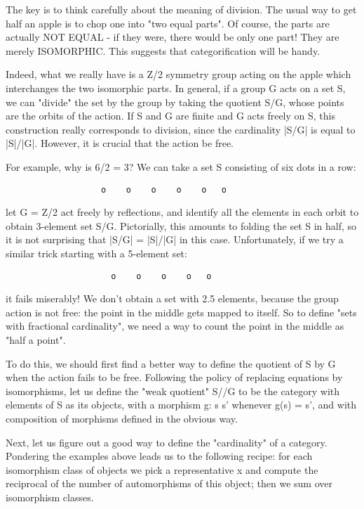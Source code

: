 The key is to think carefully about the meaning of division.  The 
usual way to get half an apple is to chop one into "two equal parts".
Of course, the parts are actually NOT EQUAL - if they were, there 
would be only one part!  They are merely ISOMORPHIC.  This suggests
that categorification will be handy.  

Indeed, what we really have is a Z/2 symmetry group acting on the 
apple which interchanges the two isomorphic parts.  In general, if a
group G acts on a set S, we can "divide" the set by the group by
taking the quotient S/G, whose points are the orbits of the action.  
If S and G are finite and G acts freely on S, this construction
really corresponds to division, since the cardinality |S/G| is
equal to |S|/|G|.   However, it is crucial that the action be free.

For example, why is 6/2 = 3?  We can take a set S consisting of six
dots in a row:

\begin{verbatim}
                   o    o    o    o    o   o
\end{verbatim}
    
let G = Z/2 act freely by reflections, and identify all the elements in 
each orbit to obtain 3-element set S/G.   Pictorially, this amounts to 
folding the set S in half, so it is not surprising that |S/G| = |S|/|G| 
in this case.  Unfortunately, if we try a similar trick starting with a 
5-element set:

\begin{verbatim}
                     o    o    o    o   o
\end{verbatim}
    
it fails miserably!  We don't obtain a set with 2.5 elements, because 
the group action is not free: the point in the middle gets mapped to 
itself.   So to define "sets with fractional cardinality", we need a 
way to count the point in the middle as "half a point".

To do this, we should first find a better way to define the quotient of
S by G when the action fails to be free.  Following the policy of
replacing equations by isomorphisms, let us define the "weak
quotient" S//G to be the category with elements of S as its
objects, with a morphism g: s \to  s' whenever g(s) = s', and with
composition of morphisms defined in the obvious way.

Next, let us figure out a good way to define the "cardinality" of a
category.   Pondering the examples above leads us to the following 
recipe: for each isomorphism class of objects we pick a representative x 
and compute the reciprocal of the number of automorphisms of this object;
then we sum over isomorphism classes. 

